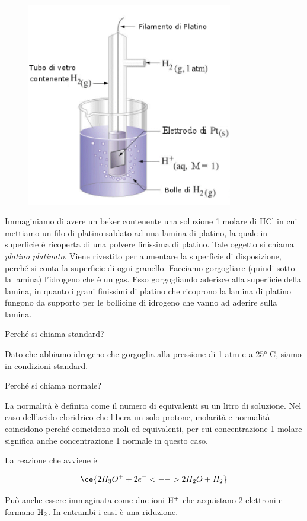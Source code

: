 \begin{figure}[H]
    \centering
    \includegraphics[width=9cm]{immagini/Elettrodo_a_idrogeno.png}
\end{figure}

Immaginiamo di avere un beker contenente una soluzione 1 molare di HCl in cui mettiamo un filo di platino saldato ad una lamina di platino, la quale in superficie è ricoperta di una polvere finissima di platino. Tale oggetto si chiama \textit{platino platinato}. Viene rivestito per aumentare la superficie di disposizione, perché si conta la superficie di ogni granello. Facciamo gorgogliare (quindi sotto la lamina) l'idrogeno che è un gas. Esso gorgogliando aderisce alla superficie della lamina, in quanto i grani finissimi di platino che ricoprono la lamina di platino fungono da supporto per le bollicine di idrogeno che vanno ad aderire sulla lamina.

\vspace{0.2cm}Perché si chiama standard?

Dato che abbiamo idrogeno che gorgoglia alla pressione di 1 atm e a 25° C, siamo in condizioni standard.

Perché si chiama normale?

La normalità è definita come il numero di equivalenti su un litro di soluzione. Nel caso dell'acido cloridrico che libera un solo protone, molarità e normalità coincidono perché coincidono moli ed equivalenti, per cui concentrazione 1 molare significa anche concentrazione 1 normale in questo caso.

La reazione che avviene è

$$\ce{2H_3O^+ + 2e^- <--> 2H_2O + H_2}$$

Può anche essere immaginata come due ioni $\rm H^+$ che acquistano 2 elettroni e formano $\rm H_2$. In entrambi i casi è una riduzione.

